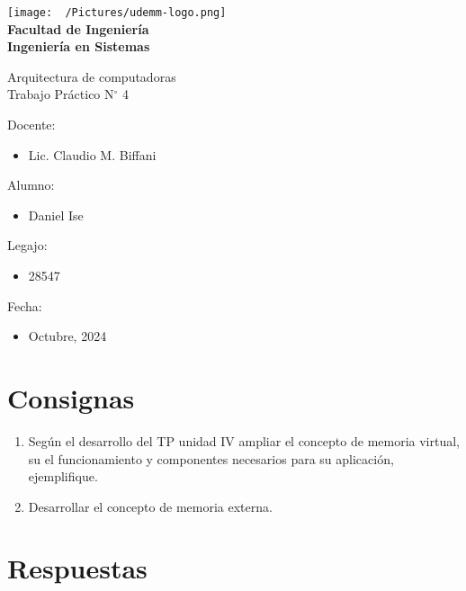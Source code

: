 \documentclass[12pt]{article}
\begin{document}
\thispagestyle{empty}

\begin{center}
  \vspace*{.5cm}
  \texttt{[image: ~/Pictures/udemm-logo.png]}\\
  \vspace{.2cm}
  \Large
  \textbf{Facultad de Ingeniería}\\
  \textbf{Ingeniería en Sistemas}\\
  \vspace{2cm}

  \Huge
  Arquitectura de computadoras\\
  Trabajo Práctico N\(^\circ\) 4\\
  \vfill

  \raggedright
  \Large
  Docente:
  \begin{itemize}
    \item[] Lic. Claudio M. Biffani \\
  \end{itemize}
  Alumno:
  \begin{itemize}
    \item[] Daniel Ise
  \end{itemize}
  Legajo:
  \begin{itemize}
    \item[] 28547
  \end{itemize}
  Fecha:
  \begin{itemize}
    \item[] Octubre, 2024
  \end{itemize}
\end{center}

\pagebreak

\tableofcontents

\pagebreak

\section{Consignas}

\begin{enumerate}
  \item Según el desarrollo del TP unidad IV ampliar el concepto de memoria virtual, su el funcionamiento y componentes necesarios para su aplicación, ejemplifique.
  \item Desarrollar el concepto de memoria externa.
\end{enumerate}

\section{Respuestas}
\end{document}
